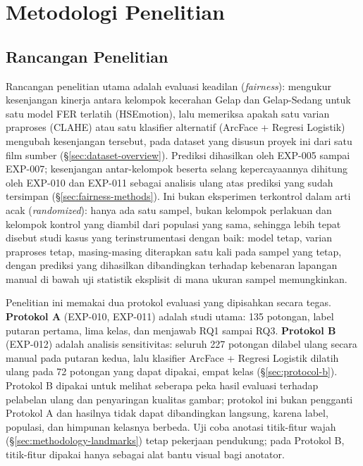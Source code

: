 \chapter{Metodologi Penelitian}
\label{chap:methodology}

\section{Rancangan Penelitian}

Rancangan penelitian utama adalah evaluasi keadilan (\textit{fairness}): mengukur kesenjangan kinerja antara kelompok kecerahan Gelap dan Gelap-Sedang untuk satu model FER terlatih (HSEmotion), lalu memeriksa apakah satu varian praproses (CLAHE) atau satu klasifier alternatif (ArcFace + Regresi Logistik) mengubah kesenjangan tersebut, pada dataset yang disusun proyek ini dari satu film sumber (\S\ref{sec:dataset-overview}). Prediksi dihasilkan oleh EXP-005 sampai EXP-007; kesenjangan antar-kelompok beserta selang kepercayaannya dihitung oleh EXP-010 dan EXP-011 sebagai analisis ulang atas prediksi yang sudah tersimpan (\S\ref{sec:fairness-methods}). Ini bukan eksperimen terkontrol dalam arti acak (\textit{randomized}): hanya ada satu sampel, bukan kelompok perlakuan dan kelompok kontrol yang diambil dari populasi yang sama, sehingga lebih tepat disebut studi kasus yang terinstrumentasi dengan baik: model tetap, varian praproses tetap, masing-masing diterapkan satu kali pada sampel yang tetap, dengan prediksi yang dihasilkan dibandingkan terhadap kebenaran lapangan manual di bawah uji statistik eksplisit di mana ukuran sampel memungkinkan.

Penelitian ini memakai dua protokol evaluasi yang dipisahkan secara tegas. \textbf{Protokol A} (EXP-010, EXP-011) adalah studi utama: 135 potongan, label putaran pertama, lima kelas, dan menjawab RQ1 sampai RQ3. \textbf{Protokol B} (EXP-012) adalah analisis sensitivitas: seluruh 227 potongan dilabel ulang secara manual pada putaran kedua, lalu klasifier ArcFace + Regresi Logistik dilatih ulang pada 72 potongan yang dapat dipakai, empat kelas (\S\ref{sec:protocol-b}). Protokol B dipakai untuk melihat seberapa peka hasil evaluasi terhadap pelabelan ulang dan penyaringan kualitas gambar; protokol ini bukan pengganti Protokol A dan hasilnya tidak dapat dibandingkan langsung, karena label, populasi, dan himpunan kelasnya berbeda. Uji coba anotasi titik-fitur wajah (\S\ref{sec:methodology-landmarks}) tetap pekerjaan pendukung; pada Protokol B, titik-fitur dipakai hanya sebagai alat bantu visual bagi anotator.

